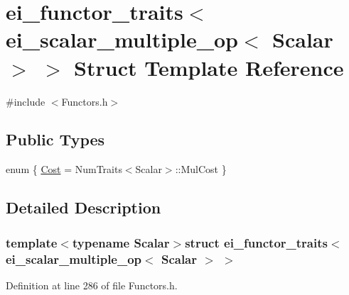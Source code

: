 \hypertarget{structei__functor__traits_3_01ei__scalar__multiple__op_3_01_scalar_01_4_01_4}{\section{ei\-\_\-functor\-\_\-traits$<$ ei\-\_\-scalar\-\_\-multiple\-\_\-op$<$ Scalar $>$ $>$ Struct Template Reference}
\label{structei__functor__traits_3_01ei__scalar__multiple__op_3_01_scalar_01_4_01_4}
}


{\ttfamily \#include $<$Functors.\-h$>$}

\subsection*{Public Types}
\begin{DoxyCompactItemize}
\item 
enum \{ \hyperlink{structei__functor__traits_3_01ei__scalar__multiple__op_3_01_scalar_01_4_01_4_ada8e544e1769bc2dd640a7e5cf19c49aa0d8ceb0cb815f002ac2cdf5648f68d2e}{Cost} = Num\-Traits$<$Scalar$>$\-:\-:Mul\-Cost
 \}
\end{DoxyCompactItemize}


\subsection{Detailed Description}
\subsubsection*{template$<$typename Scalar$>$struct ei\-\_\-functor\-\_\-traits$<$ ei\-\_\-scalar\-\_\-multiple\-\_\-op$<$ Scalar $>$ $>$}



Definition at line 286 of file Functors.\-h.



